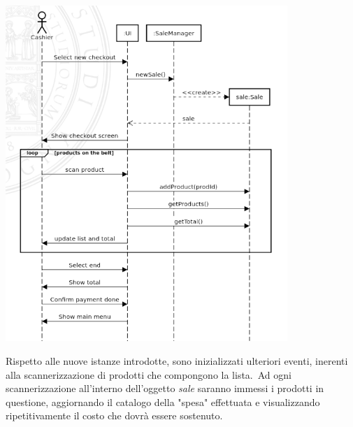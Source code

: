 \documentclass{article}
\begin{document}
\begin{center}
    \includegraphics[width=0.8\textwidth]{foto 3.png}
\end{center}
Rispetto alle nuove istanze introdotte, sono inizializzati ulteriori eventi, inerenti alla scannerizzazione di prodotti che compongono la lista.\ Ad ogni scannerizzazione all'interno dell'oggetto \textit{sale} saranno immessi i prodotti in questione, aggiornando il catalogo della "spesa" effettuata e visualizzando ripetitivamente il costo che dovrà essere sostenuto.
\end{document}
